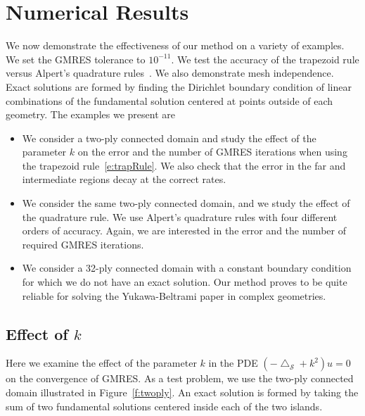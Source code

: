 \documentclass[final]{siamltex}
\newcommand{\lap}{\bigtriangleup}
\renewcommand{\S} {\mathcal{S}}
\begin{document}
\section{Numerical Results}
We now demonstrate the effectiveness of our method on a variety of
examples.  We set the GMRES tolerance to $10^{-11}$.  We test the
accuracy of the trapezoid rule versus Alpert's quadrature
rules~\cite{alpert}.  We also demonstrate mesh independence.  Exact
solutions are formed by finding the Dirichlet boundary condition of
linear combinations of the fundamental solution centered at points
outside of each geometry.  The examples we present are
\begin{itemize}
  \item We consider a two-ply connected domain and study the effect of
  the parameter $k$ on the error and the number of GMRES iterations when
  using the trapezoid rule~\eqref{e:trapRule}.  We also check that the
  error in the far and intermediate regions decay at the correct rates.
  \item We consider the same two-ply connected domain, and we study the
  effect of the quadrature rule.  We use Alpert's quadrature rules with
  four different orders of accuracy.  Again, we are interested in the
  error and the number of required GMRES iterations.
  \item We consider a 32-ply connected domain with a constant boundary
  condition for which we do not have an exact solution.  Our method
  proves to be quite reliable for solving the Yukawa-Beltrami paper in
  complex geometries.
\end{itemize}

\subsection*{Effect of $k$}

Here we examine the effect of the parameter $k$ in the PDE
$(-\lap_{\S} + k^{2})u=0$ on the convergence of GMRES.  As a test
problem, we use the two-ply connected domain illustrated in
Figure~\ref{f:twoply}.  An exact solution is formed by taking the sum
of two fundamental solutions centered inside each of the two islands.
\end{document}
